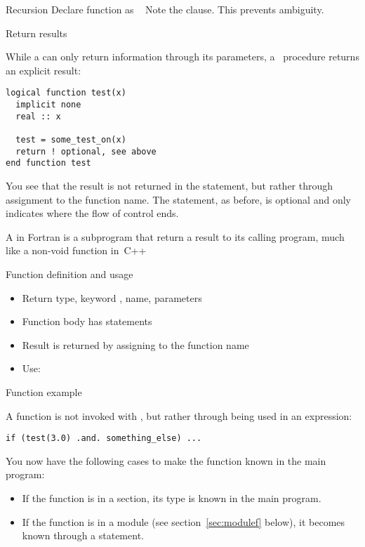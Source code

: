 \begin{block}{Recursion}
  \label{sl:funcf:recursion}
  Declare function as ~
  Note the  clause. This prevents ambiguity.
\end{block}

 {Return results}

While a  can only return information through its parameters,
a~ procedure returns an explicit result:
\begin{lstlisting}
logical function test(x)
  implicit none
  real :: x

  test = some_test_on(x)
  return ! optional, see above
end function test
\end{lstlisting}
You see that the result is not returned in the  statement,
but rather through assignment to the function name. The 
statement, as before, is optional and only indicates where the flow of
control ends.

A  in Fortran is a subprogram that return a
result to its calling program, much like a non-void function in~C++

\begin{block}{Function definition and usage}
  \label{sl:ffunction-def}
  \begin{itemize}
  \item Return type, keyword , name, parameters
  \item Function body has statements
  \item Result is returned by assigning to the function name
  \item Use: 
  \end{itemize}
\end{block}

\begin{block}{Function example}
  \label{sl:ffunction-ex}
\end{block}

A function is not invoked with , but rather through being used
in an expression:
\begin{lstlisting}
if (test(3.0) .and. something_else) ...
\end{lstlisting}
You now have the following cases to make the function known in the
main program:
\begin{itemize}
\item If the function is in a  section, its type is known
  in the main program.
\item If the function is in a module (see section~\ref{sec:modulef}
  below), it becomes known through a  statement.
\end{itemize}

